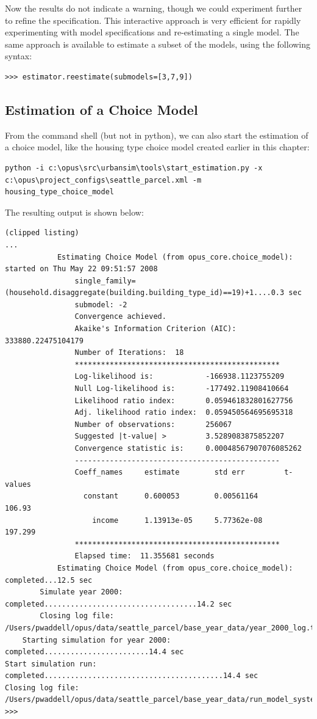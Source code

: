 Now the results do not indicate a warning, though we could experiment further to refine the specification. This interactive approach is very efficient for rapidly experimenting with model specifications and re-estimating a single model.  The same approach is available to estimate a subset of the models, using the following syntax:

\begin{lstlisting}
>>> estimator.reestimate(submodels=[3,7,9])
\end{lstlisting}

\subsection{Estimation of a Choice Model}

From the command shell (but not in python), we can also start the estimation of a choice model, like the housing type choice model created earlier in this chapter:

\begin{lstlisting}
python -i c:\opus\src\urbansim\tools\start_estimation.py -x c:\opus\project_configs\seattle_parcel.xml -m housing_type_choice_model 
\end{lstlisting}

The resulting output is shown below:

\begin{lstlisting}
(clipped listing)
...
            Estimating Choice Model (from opus_core.choice_model): started on Thu May 22 09:51:57 2008
                single_family=(household.disaggregate(building.building_type_id)==19)+1....0.3 sec
                submodel: -2
                Convergence achieved.
                Akaike's Information Criterion (AIC):  333880.22475104179
                Number of Iterations:  18
                ***********************************************
                Log-likelihood is:            -166938.1123755209
                Null Log-likelihood is:       -177492.11908410664
                Likelihood ratio index:       0.059461832801627756
                Adj. likelihood ratio index:  0.059450564695695318
                Number of observations:       256067
                Suggested |t-value| >         3.5289083875852207
                Convergence statistic is:     0.00048567907076085262
                -----------------------------------------------
                Coeff_names     estimate        std err         t-values
                  constant      0.600053        0.00561164        106.93
                    income      1.13913e-05     5.77362e-08      197.299
                ***********************************************
                Elapsed time:  11.355681 seconds
            Estimating Choice Model (from opus_core.choice_model): completed...12.5 sec
        Simulate year 2000: completed...................................14.2 sec
        Closing log file: /Users/pwaddell/opus/data/seattle_parcel/base_year_data/year_2000_log.txt
    Starting simulation for year 2000: completed........................14.4 sec
Start simulation run: completed.........................................14.4 sec
Closing log file: /Users/pwaddell/opus/data/seattle_parcel/base_year_data/run_model_system.log
>>> 
\end{lstlisting}

